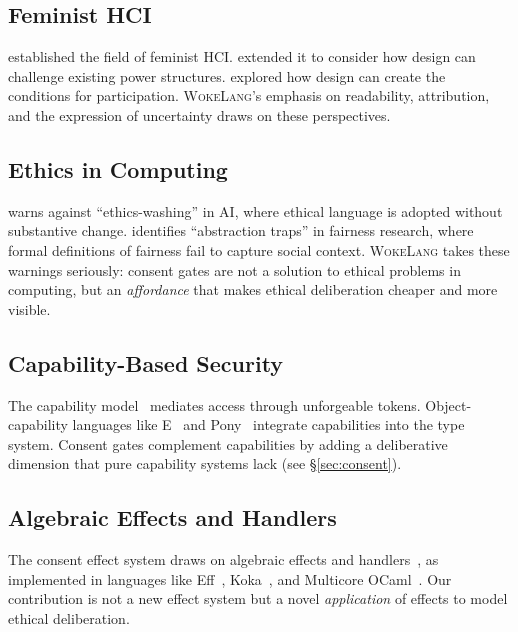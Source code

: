\documentclass[11pt,a4paper]{article}
\newcommand{\WokeLang}{\textsc{WokeLang}}
\begin{document}
\subsection{Feminist HCI}

\citet{bardzell2010feminist} established the field of feminist HCI.
\citet{light2011hci} extended it to consider how design can challenge
existing power structures.  \citet{dantec2009infrastructuring}
explored how design can create the conditions for participation.
\WokeLang{}'s emphasis on readability, attribution, and the
expression of uncertainty draws on these perspectives.

\subsection{Ethics in Computing}

\citet{green2019good} warns against ``ethics-washing'' in AI, where
ethical language is adopted without substantive change.
\citet{selbst2019fairness} identifies ``abstraction traps'' in
fairness research, where formal definitions of fairness fail to
capture social context.  \WokeLang{} takes these warnings seriously:
consent gates are not a solution to ethical problems in computing,
but an \emph{affordance} that makes ethical deliberation cheaper and
more visible.

\subsection{Capability-Based Security}

The capability model~\citep{dennis1966programming,miller2006robust}
mediates access through unforgeable tokens.  Object-capability
languages like E~\citep{miller2006robust} and
Pony~\citep{clebsch2015deny} integrate capabilities into the type
system.  Consent gates complement capabilities by adding a
deliberative dimension that pure capability systems lack (see
\S\ref{sec:consent}).

\subsection{Algebraic Effects and Handlers}

The consent effect system draws on algebraic effects and
handlers~\citep{plotkin2009handlers,bauer2015programming}, as
implemented in languages like
Eff~\citep{bauer2012programming},
Koka~\citep{leijen2017type}, and
Multicore OCaml~\citep{sivaramakrishnan2021retrofitting}.  Our
contribution is not a new effect system but a novel \emph{application}
of effects to model ethical deliberation.
\end{document}
